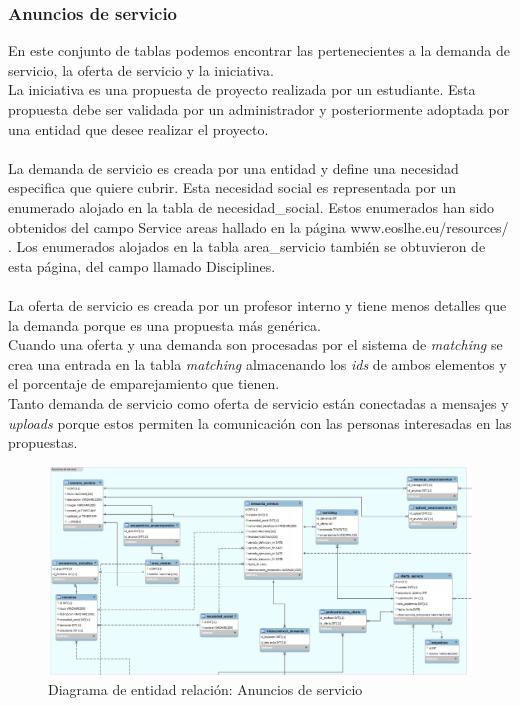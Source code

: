 \documentclass[11pt]{article}
\begin{document}
\subsubsection{Anuncios de servicio}
En este conjunto de tablas podemos encontrar las pertenecientes a la demanda de servicio, la oferta de servicio y la iniciativa.\\
La iniciativa es una propuesta de proyecto realizada por un estudiante. Esta propuesta debe ser validada por un administrador y posteriormente adoptada por una entidad que desee realizar el proyecto.\\\\
La demanda de servicio es creada por una entidad y define una necesidad especifica que quiere cubrir. Esta necesidad social es representada por un enumerado alojado en la tabla de necesidad\_social.
Estos enumerados han sido obtenidos del campo Service areas hallado en la página www.eoslhe.eu/resources/ .
Los enumerados alojados en la tabla area\_servicio también se obtuvieron de esta página, del campo llamado Disciplines.\\\\
La oferta de servicio es creada por un profesor interno y tiene menos detalles que la demanda porque es una propuesta más genérica.\\
Cuando una oferta y una demanda son procesadas por el sistema de \textit{matching} se crea una entrada en la tabla \textit{matching} almacenando los \textit{ids} de ambos elementos y el porcentaje de emparejamiento que tienen.\\
Tanto demanda de servicio como oferta de servicio están conectadas a mensajes y \textit{uploads} porque estos permiten la comunicación con las personas interesadas en las propuestas.
\begin{figure}
	\centering
	\includegraphics[scale=0.35]{anuncios}
	\caption{Diagrama de entidad relación: Anuncios de servicio}
\end{figure}
\end{document}
